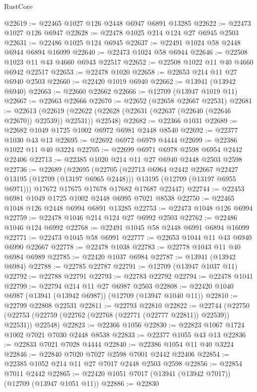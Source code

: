 \begin{lexlean}{RustCore}
\begin{coremodule}
@22619 := @22465 @1027 @126 @2448 @6947 @6891 @13285
@22622 := @22473 @1027 @126 @6947
@22628 := @22478 @1025 @214 @124 @27 @6945 @2503
@22631 := @22486 @1025 @124 @6945
@22637 := @22491 @1024 @58 @2448 @6944 @6894 @16099
@22640 := @22473 @1024 @58 @6944
@22646 := @22508 @1023 @11 @43 @4660 @6943 @22517
@22652 := @22508 @1022 @11 @40 @4660 @6942 @22517
@22653 := @22478 @1020
@22658 := @22653 @214 @11 @27 @6940 @2503
@22660 := @22420 @1019 @6940
@22662 := @13941 (@13942 @6940)
@22663 := @22660 @22662
@22666 := @12709 (@13947 @1019 @11)
@22667 := @22663 @22666
@22670 := @22652 (@22658 @22667 @22531)
@22681 := @22613
    (@22619 (@22622 (@22628 (@22631 (@22637 (@22640 (@22646 @22670)) @22539)) @22531)) @22548)
@22682 := @22366 @1031
@22689 := @22682 @1049 @1725 @1002 @6972 @6981 @2448 @8540
@22692 := @22377 @1030 @43 @13
@22695 := @22692 @6972 @6979 @4444
@22699 := @22386 @1022 @11 @40 @3224
@22705 := @22699 @6971 @6978 @2598 @6954 @2442 @22406
@22713 := @22385 @1020 @214 @11 @27 @6940 @2448 @2503 @2598
@22736 := @22689
    (@22695
      (@22705
        (@22713 @6964 @2442 @22667 @22427 @13195 (@12709 (@13197 @6965 @2448)))
        @13195
        (@12709 (@13197 @6955 @6971)))
      @17672
      @17675
      @17678
      @17682
      @17687
      @22447)
@22744 := @22453 @6981 @1049 @1725 @1002 @2448 @6995 @7021 @8538
@22750 := @22465 @1048 @126 @2448 @6994 @6891 @13285
@22753 := @22473 @1048 @126 @6994
@22759 := @22478 @1046 @214 @124 @27 @6992 @2503
@22762 := @22486 @1046 @124 @6992
@22768 := @22491 @1045 @58 @2448 @6991 @6894 @16099
@22771 := @22473 @1045 @58 @6991
@22777 := @22653 @1044 @11 @43 @6940 @6990 @22667
@22778 := @22478 @1038
@22783 := @22778 @1043 @11 @40 @6984 @6989
@22785 := @22420 @1037 @6984
@22787 := @13941 (@13942 @6984)
@22788 := @22785 @22787
@22791 := @12709 (@13947 @1037 @11)
@22792 := @22788 @22791
@22793 := @22783 @22792
@22794 := @22478 @1041
@22799 := @22794 @214 @11 @27 @6987 @2503
@22808 := @22420 @1040 @6987 (@13941 (@13942 @6987)) (@12709 (@13947 @1040 @11))
@22810 := @22799 @22808 @22531
@22811 := @22793 @22810
@22822 := @22744
    (@22750 (@22753 (@22759 (@22762 (@22768 (@22771 (@22777 @22811)) @22539)) @22531)) @22548)
@22823 := @22366 @1056
@22830 := @22823 @1067 @1724 @1002 @7021 @7030 @2448 @8538
@22833 := @22377 @1055 @43 @13
@22836 := @22833 @7021 @7028 @4444
@22840 := @22386 @1054 @11 @40 @3224
@22846 := @22840 @7020 @7027 @2598 @7001 @2442 @22406
@22854 := @22385 @1052 @214 @11 @27 @7017 @2448 @2503 @2598
@22856 := @22854 @7011 @2442
@22865 := @22420 @1051 @7017 (@13941 (@13942 @7017)) (@12709 (@13947 @1051 @11))
@22886 := @22830

\end{coremodule}
\end{lexlean}
